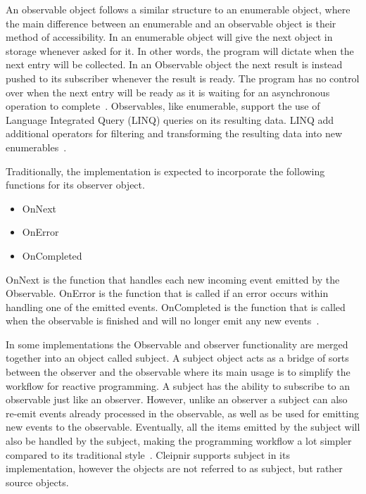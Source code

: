 An observable object follows a similar structure to an enumerable object, where the main difference between an enumerable and an observable object is their method of accessibility. In an enumerable object will give the next object in storage whenever asked for it. In other words, the program will dictate when the next entry will be collected. In an Observable object the next result is instead pushed to its subscriber whenever the result is ready. The program has no control over when the next entry will be ready as it is waiting for an asynchronous operation to complete~\cites{WEB:ReactiveObservable, VIDEO:dotnetsheffReactive, VIDEO:MicroDev}[p.~15]{BOOK:RxLinq}. Observables, like enumerable, support the use of Language Integrated Query (LINQ) queries on its resulting data. LINQ add additional operators for filtering and transforming the resulting data into new enumerables~\cites{VIDEO:dotnetsheffReactive}[p.~3-4]{BOOK:RxLinq}[p.~208]{BOOK:DotnetMultithreadCookBook}.

Traditionally, the implementation is expected to incorporate the following functions for its observer object.
\begin{itemize}
	\item{OnNext}
	\item{OnError}
	\item{OnCompleted}
\end{itemize}

OnNext is the function that handles each new incoming event emitted by the Observable. OnError is the function that is called if an error occurs within handling one of the emitted events. OnCompleted is the function that is called when the observable is finished and will no longer emit any new events~\cite{WEB:ReactiveObservable}.

In some implementations the Observable and observer functionality are merged together into an object called subject. A subject object acts as a bridge of sorts between the observer and the observable where its main usage is to simplify the workflow for reactive programming. A subject has the ability to subscribe to an observable just like an observer. However, unlike an observer a subject can also re-emit events already processed in the observable, as well as be used for emitting new events to the observable. Eventually, all the items emitted by the subject will also be handled by the subject, making the programming workflow a lot simpler compared to its traditional style~\cite{WEB:ReactiveSubject}. Cleipnir supports subject in its implementation, however the objects are not referred to as subject, but rather source objects.

\iffalse
-a brief introduce reactive programming
-usecase
-the ReactiveX library(what it does, how it works and the mention Rx.Net)
-give brief through workflow, concepts with name and definitions and how it works.(Observable, stream of data, subjects, event driven programming)
-mention briefly Cleipnir support for reactive programming, how they differ, say detail information is given in Cleipnir chapter.
\fi
